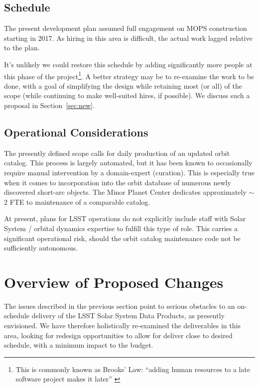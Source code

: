 \documentclass[DM,authoryear,toc]{lsstdoc}
\begin{document}
\subsection{Schedule\label{sec:schedule}}

The present development plan assumed full engagement on MOPS construction starting in 2017. As hiring in this area is difficult, the actual work lagged relative to the plan.

It's unlikely we could restore this schedule by adding significantly more people at this phase of the project\footnote{This is commonly known as Brooks' Law: ``adding human resources to a late software project makes it later'' \citep{1982mmme.book.....B}}. A better strategy may be to re-examine the work to be done, with a goal of simplifying the design while retaining most (or all) of the scope (while continuing to make well-suited hires, if possible). We discuss such a proposal in Section~\ref{sec:new}.

\subsection{Operational Considerations}

The presently defined scope calls for daily production of an updated orbit catalog. This process is largely automated, but it has been known to occasionally require manual intervention by a domain-expert (curation). This is especially true when it comes to incorporation into the orbit database of numerous newly discovered short-arc objects. The Minor Planet Center dedicates approximately $\sim$2 FTE to maintenance of a comparable catalog.

At present, plans for LSST operations do not explicitly include staff with Solar System / orbital dynamics expertise to fulfill this type of role. This carries a significant operational risk, should the orbit catalog maintenance code not be sufficiently autonomous.

\section{Overview of Proposed Changes\label{sec:new}}

The issues described in the previous section point to serious obstacles to an on-schedule delivery of the LSST Solar System Data Products, as presently envisioned. We have therefore holistically re-examined the deliverables in this area, looking for redesign opportunities to allow for deliver close to desired schedule, with a minimum impact to the budget.
\end{document}
